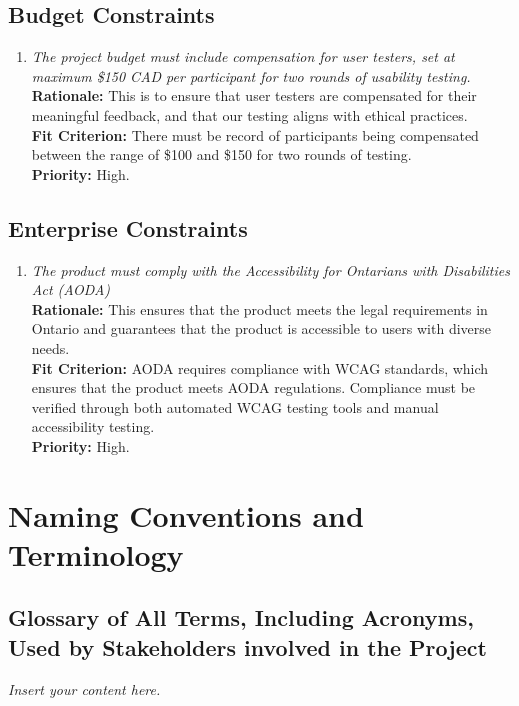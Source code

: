 \documentclass[12pt]{article}
\newcommand{\lips}{\textit{Insert your content here.}}
\begin{document}
\subsection{Budget Constraints}
\begin{enumerate}[label=MD-BC \arabic*., wide=0pt, leftmargin=*]
  \item \emph{The project budget must include compensation for user testers, set at maximum \$150 CAD per participant for two rounds of usability testing.}\\[2mm]
    {\bf Rationale:} This is to ensure that user testers are compensated for their meaningful feedback, 
    and that our testing aligns with ethical practices.\\
    {\bf Fit Criterion:} There must be record of participants being compensated between the range of \$100 and \$150 for
    two rounds of testing. \\
    {\bf Priority:} High.
\end{enumerate}
\subsection{Enterprise Constraints}
\begin{enumerate}[label=MD-EC \arabic*., wide=0pt, leftmargin=*]
  \item \emph{The product must comply with the Accessibility for Ontarians with Disabilities Act (AODA)}\\[2mm]
    {\bf Rationale:} This ensures that the product meets the legal requirements in Ontario and guarantees that 
    the product is accessible to users with diverse needs.\\
    {\bf Fit Criterion:} AODA requires compliance with WCAG standards, which ensures that the product meets AODA regulations. 
    Compliance must be verified through both automated WCAG testing tools and manual accessibility testing.\\
    {\bf Priority:} High.
\end{enumerate}

\section{Naming Conventions and Terminology}
\subsection{Glossary of All Terms, Including Acronyms, Used by Stakeholders
involved in the Project}
\lips
\end{document}
